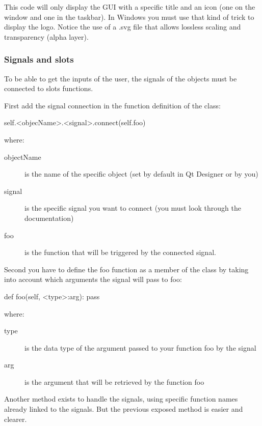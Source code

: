 \documentclass[english, 12 pt, openany, oneside]{book}
\begin{document}
This code will only display the GUI with a specific title and an icon (one on the window and one in the taskbar). In Windows you must use that kind of trick to display the logo. Notice the use of a .svg file that allows lossless scaling and transparency (alpha layer).


\subsubsection{Signals and slots}
To be able to get the inputs of the user, the signals of the objects must be connected to slots functions.

First add the signal connection in the  function definition of the  class:

\begin{pyverbatim}
self.<objecName>.<signal>.connect(self.foo)
\end{pyverbatim}

where:

\begin{description}
\item[objectName] is the name of the specific object (set by default in Qt Designer or by you)
\item[signal] is the specific signal you want to connect (you must look through the documentation)
\item[foo] is the function that will be triggered by the connected signal.
\end{description}

Second you have to define the foo function as a member of the  class by taking into account which arguments the signal will pass to foo:

\begin{pyverbatim}
def foo(self, <type>:arg):
	pass
\end{pyverbatim}
where:

\begin{description}
\item[type] is the data type of the argument passed to your function foo by the signal
\item[arg] is the argument that will be retrieved by the function foo
\end{description}


Another method exists to handle the signals, using specific function names already linked to the signals. But the previous exposed method is easier and clearer.
\end{document}
